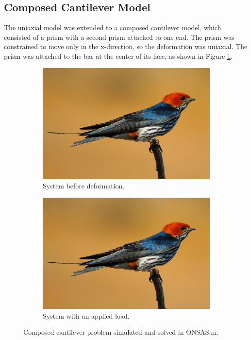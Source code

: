 \documentclass[11pt]{scrartcl} %
\begin{document}
\subsection{Composed Cantilever Model}
The uniaxial model was extended to a composed cantilever model, which consisted of a prism with a second prism attached to one end. The prism was constrained to move only in the x-direction, so the deformation was uniaxial. The prism was attached to the bar at the center of its face, as shown in Figure \ref{fig:composed_cantilever_model}.
\begin{figure}[h]
	\centering
	\begin{subfigure}[b]{0.48\textwidth}
	\centering
	\includegraphics[width=\textwidth]{Figures/swallow.jpg}
	\caption{System before deformation.}
	\end{subfigure}
	\hfill
	\begin{subfigure}[b]{0.48\textwidth}
	\centering
	\includegraphics[width=\textwidth]{Figures/swallow.jpg}
	\caption{System with an applied load.}
	\end{subfigure}
	\caption{Composed cantilever problem simulated and solved in ONSAS.m.}
	\label{fig:composed_cantilever_model}
	\end{figure}
\end{document}
